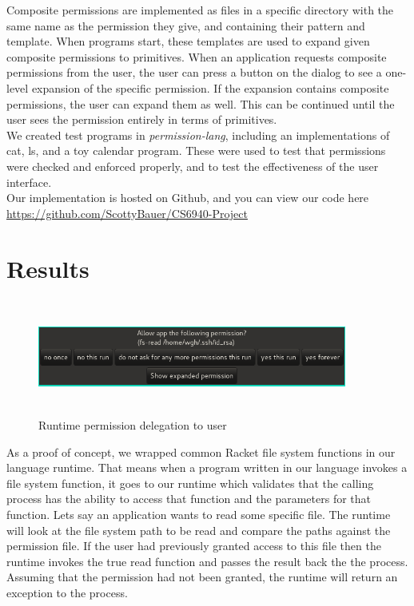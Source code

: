 Composite permissions are implemented as files in a specific directory with the same name as the permission they give, and containing their pattern and template.  When programs start, these templates are used to expand given composite permissions to primitives.  When an application requests composite permissions from the user, the user can press a button on the dialog to see a one-level expansion of the specific permission.  If the expansion contains composite permissions, the user can expand them as well.  This can be continued until the user sees the permission entirely in terms of primitives.
\\

We created test programs in \textit{permission-lang}, including an implementations of cat, ls, and a toy calendar program.
These were used to test that permissions were checked and enforced properly, and to test the effectiveness of the user interface.\\
Our implementation is hosted on Github, and you can view our code here \url{https://github.com/ScottyBauer/CS6940-Project}


\section{Results}\label{section:ResImp}
\begin{figure}
\centering
\includegraphics[height=1.5in, width=4in]{ask-permission.png}
\caption{Runtime permission delegation to user}
\end{figure}


As a proof of concept, we wrapped common Racket file system functions in our language runtime. That means when a program written in our language invokes a file system function, it goes to our runtime which validates that the calling process has the ability to access that function and the parameters for that function. Lets say an application wants to read some specific file. The runtime will look at the file system path to be read and compare the paths against the permission file. If the user had previously granted access to this file then the runtime invokes the true read function and passes the result back the the process. Assuming that the permission had not been granted, the runtime will return an exception to the process.
\\

